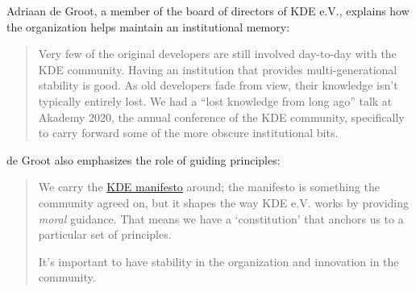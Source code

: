 \begin{kaobox}[frametitle=The role of KDE e.V. in maintaining institutional memory for the KDE community]

Adriaan de Groot, a member of the board of directors of KDE e.V., explains how the organization helps maintain an institutional memory:

\begin{quote}

Very few of the original developers are still involved day-to-day with the KDE community.  Having an institution that provides multi-generational stability is good.  As old developers fade from view, their knowledge isn't typically entirely lost.  We had a ``lost knowledge from long ago'' talk at Akademy 2020, the annual conference of the KDE community, specifically to carry forward some of the more obscure institutional bits.

\end{quote}

de Groot also emphasizes the role of guiding principles:

\begin{quote}

We carry the \href{https://manifesto.kde.org/}{KDE manifesto} around; the manifesto is something the community agreed on, but it shapes the way KDE e.V. works by providing \textit{moral} guidance.  That means we have a `constitution' that anchors us to a particular
set of principles.

It's important to have stability in the organization and innovation in the community.

\end{quote}

\end{kaobox}

